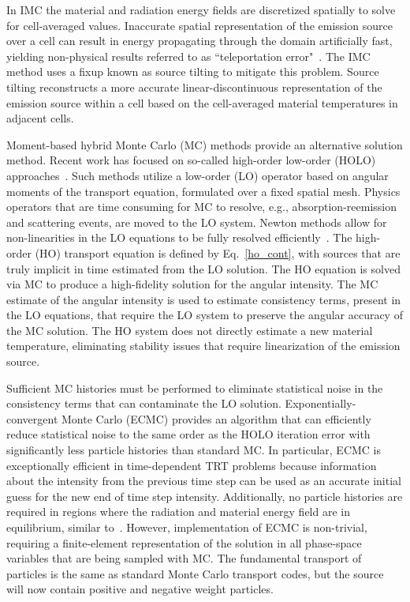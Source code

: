 \documentclass[12pt]{article}
\begin{document}
\begin{center}
In IMC the material and radiation energy fields are discretized spatially to solve for cell-averaged values.
Inaccurate spatial representation of the emission source over a cell can result in
energy propagating through the domain artificially fast, yielding non-physical
results referred to as ``teleportation error"~\cite{teleportation}.  The IMC method uses a fixup known as source tilting
to mitigate this problem.  Source tilting reconstructs a more accurate
linear-discontinuous representation of the
emission source within a cell based on the cell-averaged material temperatures in adjacent
cells. 

Moment-based hybrid Monte Carlo (MC) methods provide an alternative solution method.
Recent work has focused on so-called high-order low-order (HOLO)
approaches~\cite{willert,park,rmc,ans_2014}.  Such methods utilize a low-order (LO)
operator based on angular moments of the transport equation, formulated over a fixed
spatial mesh. Physics operators that are time consuming for MC
to resolve, e.g., absorption-reemission and scattering events, are moved to the LO
system.  Newton methods allow for non-linearities in the LO equations to be fully
resolved efficiently~\cite{willert}.  The high-order (HO) transport equation is defined by 
Eq.~\eqref{ho_cont}, with sources that are truly implicit in time estimated from the LO solution. The HO equation is solved via MC to produce a high-fidelity solution for
the angular intensity.  The MC estimate of the angular intensity is used to estimate consistency terms,
present in the LO equations, that require the LO system to preserve the angular accuracy of the
MC solution.  The HO system does not directly estimate a new material temperature,
eliminating stability issues that require linearization of the emission source.

Sufficient MC histories must be performed to eliminate statistical
noise in the consistency terms that can contaminate the LO solution.
Exponentially-convergent Monte Carlo (ECMC)\cite{jake,ans_2014} provides an algorithm that can efficiently
reduce statistical noise to the same order as the HOLO iteration error with
significantly less particle histories than standard MC. In particular, ECMC is
exceptionally efficient in time-dependent TRT problems because information about the
intensity from the previous time step can be used as an accurate initial guess for
the new end of time step intensity. Additionally, no particle histories are required
in regions where the radiation and material energy field are in equilibrium, similar to~\cite{rmc}.  However, implementation
of ECMC is non-trivial, requiring a finite-element representation of the solution in
all phase-space variables that are being sampled with MC.  The fundamental transport of particles is the same
as standard Monte Carlo transport codes, but the source will now contain positive and
negative weight particles.


\end{center}
\end{document}
